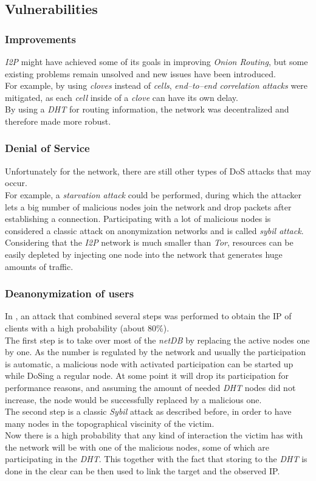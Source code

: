 \documentclass{sig-alternate}
\begin{document}
\subsection{Vulnerabilities}
\subsubsection{Improvements}
\emph{I2P} might have achieved some of its goals in improving \emph{Onion Routing}, but some existing problems remain unsolved and new issues have been introduced. 
\\
For example, by using \emph{cloves} instead of \emph{cells}, \emph{end--to--end correlation attacks} were mitigated, as each \emph{cell} inside of a \emph{clove} can have its own delay.
\\
By using a \emph{DHT} for routing information, the network was decentralized and therefore made more robust\cite{zantout2011}.

\subsubsection{Denial of Service}
Unfortunately for the network, there are still other types of DoS attacks that may occur.
\\
For example, a \emph{starvation attack} could be performed, during which the attacker lets a big number of malicious nodes join the network and drop packets after establishing a connection.
Participating with a lot of malicious nodes is considered a classic attack on anonymization networks and is called \emph{sybil attack}.
\\
Considering that the \emph{I2P} network is much smaller than \emph{Tor}, resources can be easily depleted by injecting one node into the network that generates huge amounts of traffic\cite{zantout2011}.

\subsubsection{Deanonymization of users}
In \cite{egger2013}, an attack that combined several steps was performed to obtain the IP of clients with a high probability (about 80\%).
\\
The first step is to take over most of the \emph{netDB} by replacing the active nodes one by one.
As the number is regulated by the network and usually the participation is automatic, a malicious node with activated participation can be started up while DoSing a regular node.
At some point it will drop its participation for performance reasons, and assuming the amount of needed \emph{DHT} nodes did not increase, the node would be successfully replaced by a malicious one.
\\
The second step is a classic \emph{Sybil} attack as described before, in order to have many nodes in the topographical viscinity of the victim.
\\
Now there is a high probability that any kind of interaction the victim has with the network will be with one of the malicious nodes, some of which are participating in the \emph{DHT}.
This together with the fact that storing to the \emph{DHT} is done in the clear can be then used to link the target and the observed IP.
\end{document}
